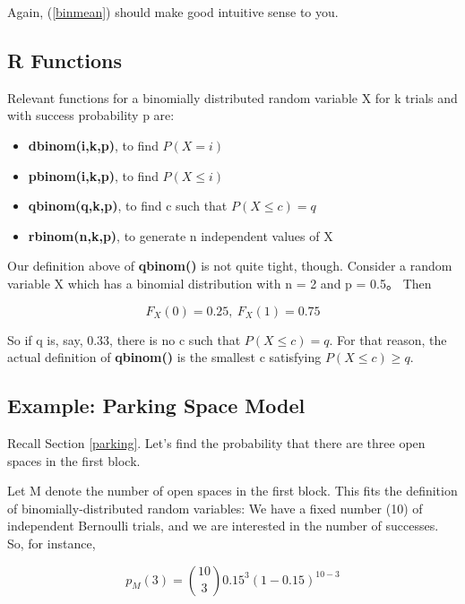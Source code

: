 Again, (\ref{binmean}) should make good intuitive sense to you.

\subsection{R Functions} 

Relevant functions for a binomially  distributed random variable X for k
trials and with success probability p are:

\begin{itemize}

\item {\bf dbinom(i,k,p)}, to find $P(X = i)$

\item {\bf pbinom(i,k,p)}, to find $P(X \leq i)$

\item {\bf qbinom(q,k,p)}, to find c such that $P(X \leq c) = q$ 

\item {\bf rbinom(n,k,p)}, to generate n independent values of X

\end{itemize}

Our definition above of {\bf qbinom()} is not quite tight, though.
Consider a random variable X which has a binomial distribution with n =
2 and p = 0.5。  Then

\begin{equation}
F_X(0) = 0.25, ~ F_X(1) = 0.75
\end{equation}

So if q is, say, 0.33, there is no c such that $P(X \leq c) = q$.  For
that reason, the actual definition of {\bf qbinom()} is the smallest c
satisfying $P(X \leq c) \ge q$.

\subsection{Example:  Parking Space Model}

Recall Section \ref{parking}.  Let's find the probability that there are
three open spaces in the first block.

Let M denote the number of open spaces in the first block.  This fits
the definition of binomially-distributed random variables:  We have a
fixed number (10) of independent Bernoulli trials, and we are interested
in the number of successes.  So, for instance,

\begin{equation}
p_{M}(3) = \binom{10}{3} 0.15^3 (1 - 0.15)^{10-3}
\end{equation}


